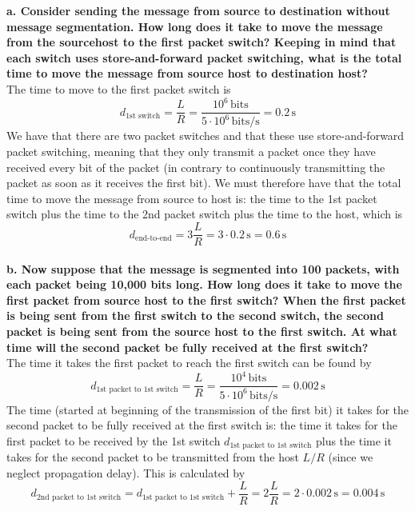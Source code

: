 \textbf{a. Consider sending the message from source to destination without message segmentation. How long does it take to move the message from the sourcehost to the first packet switch? Keeping in mind that each switch uses store-and-forward packet switching, what is the total time to move the message from source host to destination host?} \\
The time to move to the first packet switch is
\begin{equation*}
    d_\text{1st switch} = \frac{L}{R} = \frac{10^6 \, \text{bits}}{5 \cdot 10^6 \, \text{bits/s}} = 0.2 \, \text{s}
\end{equation*}
We have that there are two packet switches and that these use store-and-forward packet switching, meaning that they only transmit a packet once they have received every bit of the packet (in contrary to continuously transmitting the packet as soon as it receives the first bit). We must therefore have that the total time to move the message from source to host is: the time to the 1st packet switch plus the time to the 2nd packet switch plus the time to the host, which is
\begin{equation*}
    d_\text{end-to-end} = 3\frac{L}{R} = 3 \cdot 0.2 \, \text{s} = 0.6 \, \text{s}
\end{equation*}
\\
\textbf{b. Now suppose that the message is segmented into 100 packets, with each packet being 10,000 bits long. How long does it take to move the first packet from source host to the first switch? When the first packet is being sent from the first switch to the second switch, the second packet is being sent from the source host to the first switch. At what time will the second packet be fully received at the first switch?} \\
The time it takes the first packet to reach the first switch can be found by
\begin{equation*}
    d_\text{1st packet to 1st switch} = \frac{L}{R} = \frac{10^4 \, \text{bits}}{5 \cdot 10^6 \, \text{bits/s}} = 0.002 \, \text{s}
\end{equation*}
The time (started at beginning of the transmission of the first bit) it takes for the second packet to be fully received at the first switch is: the time it takes for the first packet to be received by the 1st switch $d_\text{1st packet to 1st switch}$ plus the time it takes for the second packet to be transmitted from the host $L/R$ (since we neglect propagation delay). This is calculated by
\begin{equation*}
     d_\text{2nd packet to 1st switch} = d_\text{1st packet to 1st switch} + \frac{L}{R} = 2 \frac{L}{R} = 2 \cdot 0.002 \, \text{s} = 0.004 \, \text{s}
\end{equation*}
